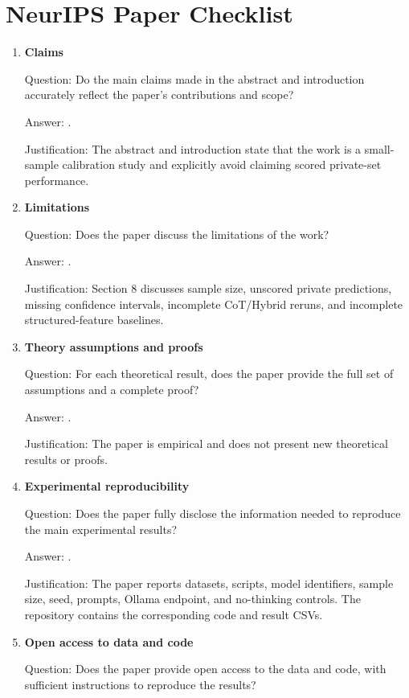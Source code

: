 \section*{NeurIPS Paper Checklist}

\begin{enumerate}
\item \textbf{Claims}

Question: Do the main claims made in the abstract and introduction accurately
reflect the paper's contributions and scope?

Answer: \answerYes{}.

Justification: The abstract and introduction state that the work is a
small-sample calibration study and explicitly avoid claiming scored private-set
performance.

\item \textbf{Limitations}

Question: Does the paper discuss the limitations of the work?

Answer: \answerYes{}.

Justification: Section 8 discusses sample size, unscored private predictions,
missing confidence intervals, incomplete CoT/Hybrid reruns, and incomplete
structured-feature baselines.

\item \textbf{Theory assumptions and proofs}

Question: For each theoretical result, does the paper provide the full set of
assumptions and a complete proof?

Answer: \answerNA{}.

Justification: The paper is empirical and does not present new theoretical
results or proofs.

\item \textbf{Experimental reproducibility}

Question: Does the paper fully disclose the information needed to reproduce the
main experimental results?

Answer: \answerYes{}.

Justification: The paper reports datasets, scripts, model identifiers, sample
size, seed, prompts, Ollama endpoint, and no-thinking controls. The repository
contains the corresponding code and result CSVs.

\item \textbf{Open access to data and code}

Question: Does the paper provide open access to the data and code, with
sufficient instructions to reproduce the results?


\end{enumerate}
